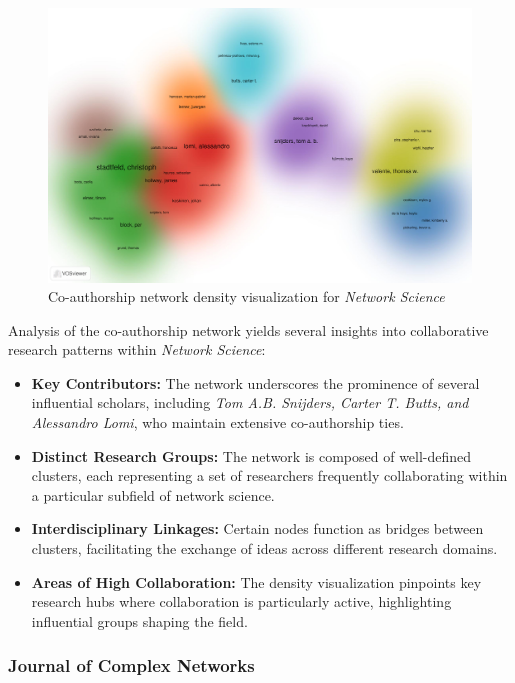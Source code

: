 \documentclass[twocolumn]{article}
\begin{document}
		\begin{figure}[htbp]
			\centering
			\includegraphics[width=\columnwidth]{Network Science/VOS/co-authorship-density.pdf}
			\caption{Co-authorship network density visualization for \textit{Network Science}}
			\label{fig.fig16}
		\end{figure}
		
		Analysis of the co-authorship network yields several insights into collaborative research patterns within \textit{Network Science}:
		
		\begin{itemize}
			\item \textbf{Key Contributors:} The network underscores the prominence of several influential scholars, including \textit{Tom A.B. Snijders, Carter T. Butts, and Alessandro Lomi}, who maintain extensive co-authorship ties.
			\item \textbf{Distinct Research Groups:} The network is composed of well-defined clusters, each representing a set of researchers frequently collaborating within a particular subfield of network science.
			\item \textbf{Interdisciplinary Linkages:} Certain nodes function as bridges between clusters, facilitating the exchange of ideas across different research domains.
			\item \textbf{Areas of High Collaboration:} The density visualization pinpoints key research hubs where collaboration is particularly active, highlighting influential groups shaping the field.
		\end{itemize}
		
		\subsubsection*{Journal of Complex Networks}
		
\end{document}
